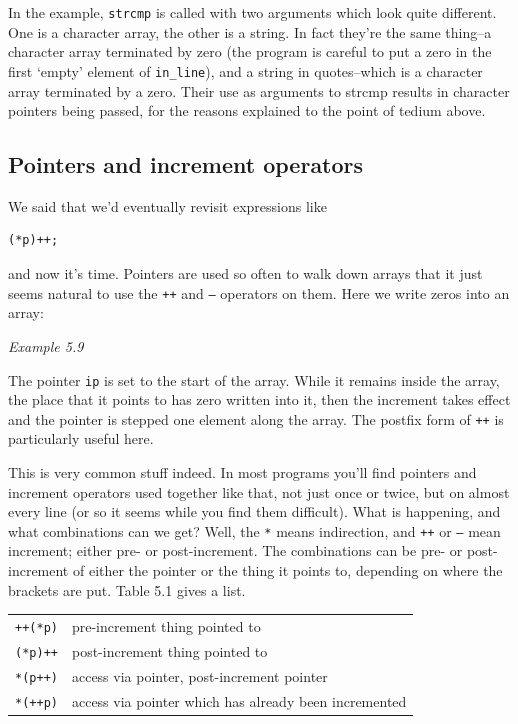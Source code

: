    In the example, \texttt{strcmp} is called with two arguments which
    look quite different. One is a character array, the other is a string.
    In fact they're the same thing--a character array terminated by zero
    (the program is careful to put a zero in the first `empty' element
    of \texttt{in\_line}), and a string in quotes--which is
    a character array terminated by a zero. Their use as arguments to strcmp
    results in character pointers being passed, for the reasons explained to
    the point of tedium above.


  

  \subsection{Pointers and increment operators}
   

   We said that we'd eventually revisit expressions like


   \begin{Verbatim}
(*p)++;
\end{Verbatim}

   and now it's time. Pointers are used so often to walk down arrays that
    it just seems natural to use the \texttt{++} and \texttt{--}
    operators on them. Here we write zeros into an array:


   \begin{center}\textit{Example 5.9}\end{center}


   The pointer \texttt{ip} is set to the start of the array. While it
    remains inside the array, the place that it points to has zero written
    into it, then the increment takes effect and the pointer is stepped one
    element along the array. The postfix form of \texttt{++} is
    particularly useful here.


   This is very common stuff indeed. In most programs you'll find
    pointers and increment operators used together like that, not just once
    or twice, but on almost every line (or so it seems while you find them
    difficult). What is happening, and what combinations can we get? Well,
    the \texttt{*} means indirection, and \texttt{++} or
    \texttt{--} mean increment; either pre- or post-increment. The
    combinations can be pre- or post-increment of either the pointer or the
    thing it points to, depending on where the brackets are put. Table 5.1 gives a list.


   \begin{tabular}{lp{\textwidth}}
     \texttt{++(*p)} & pre-increment thing pointed to
    \\

     \texttt{(*p)++} & post-increment thing pointed to
    \\

     \texttt{*(p++)} & access via pointer, post-increment pointer
    \\

     \texttt{*(++p)} & access via pointer which has already been incremented
    \\
\end{tabular}


